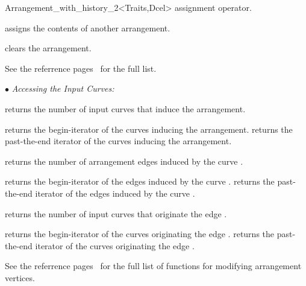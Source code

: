\begin{ccRefClass}{Arrangement_with_history_2<Traits,Dcel>}
    {assignment operator.}

    {assigns the contents of another arrangement.}

    {clears the arrangement.}


\ccAccessFunctions

See the  referrence 
pages~ for the full list.


$\bullet$ {\sl Accessing the Input Curves:}

    {returns the number of input curves that induce the arrangement.}

    {returns the begin-iterator of the curves inducing the arrangement.}
\ccGlue    
{}
    {returns the past-the-end iterator of the curves inducing the arrangement.}

    {returns the number of arrangement edges induced by the curve .}

    {returns the begin-iterator of the edges induced by the curve .}
\ccGlue
{}
    {returns the past-the-end iterator of the edges induced by the curve .}
    
    {returns the number of input curves that originate the edge .}

    {returns the begin-iterator of the curves originating the edge .}
\ccGlue
{}
    {returns the past-the-end iterator  of the curves originating the edge 
     .}
    
\ccModifiers

See the  referrence
pages~ for the full
list of functions for modifying arrangement vertices.


\end{ccRefClass}
